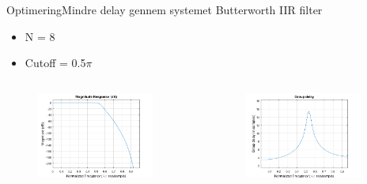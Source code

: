 \begin{frame}{Optimering}{Mindre delay gennem systemet}
Butterworth IIR filter
\begin{itemize}
\item N = 8
\item Cutoff = 0.5$\pi$
\end{itemize}
\begin{columns}
\begin{column}{0.45\textwidth}
\begin{figure}[H]
\centering
\includegraphics[width=0.9\textwidth]{IIRFrekvens}
\end{figure}
\end{column}
\begin{column}{0.45\textwidth}
\begin{figure}[H]
\centering
\includegraphics[width=0.9\textwidth]{IIRdelay}
\end{figure}
\end{column}
\end{columns}
\end{frame}

